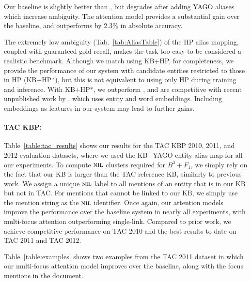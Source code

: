 Our baseline is slightly better than , but degrades
after adding YAGO aliases which increase ambiguity.
The attention model provides a substantial gain over
the baseline, and outperforms  by
2.3\% in absolute accuracy.

The extremely low ambiguity (Tab.~\ref{tab:AliasTable}) of the HP
alias mapping, coupled with guaranteed gold recall, makes the task too
easy to be considered a realistic benchmark.  Although we match
 using KB+HP, for completeness, we provide the
performance of our system with candidate entities restricted to those
in HP (KB+HP*), but this is not equivalent to using only HP during
training and inference.  With KB+HP*, we outperform ,
and are competitive with recent unpublished work by ,
which uses entity and word embeddings.  Including embeddings as features in our system may
lead to further gains.


\paragraph*{TAC KBP:}
Table~\ref{table:tac_results} shows our results for the TAC KBP 2010, 2011, and 2012
evaluation datasets, where we used the KB+YAGO entity-alias map for all our experiments. 
To compute $\mbox{\textsc{nil}}$ clusters required for $B^3+F_1$, we simply rely on the fact that our KB is larger than the TAC
reference KB, similarly to previous work. We assign a unique $\mbox{\textsc{nil}}$ label to
all mentions of an entity that is in our KB but not in TAC.  For mentions that cannot be linked
to our KB, we simply use the mention string as the $\mbox{\textsc{nil}}$ identifier.
Once again, our attention models improve the performance over the baseline
system in nearly all experiments, with multi-focus attention outperforming single-link. Compared to
prior work, we achieve competitive performance on TAC 2010 and the best
results to date on TAC 2011 and TAC 2012. 

Table~\ref{table:examples} shows two examples from the TAC 2011 dataset in which
 our multi-focus attention model
improves over the baseline, along with the focus mentions in the document.

